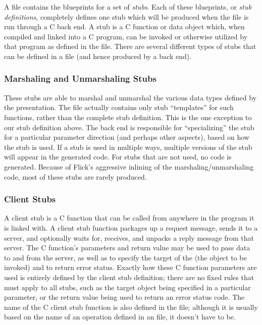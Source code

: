 A \PRESC{} file contains the blueprints for a set of \emph{stubs}.  Each of
these blueprints, or \emph{stub definitions}, completely defines one stub which
will be produced when the \PRESC{} file is run through a C back end.  A stub
is a C function or data object which, when compiled and linked into a C
program, can be invoked or otherwise utilized by that program as defined in the
\PRESC{} file.  There are several different types of stubs that can be defined
in a \PRESC{} file (and hence produced by a back end).



\subsubsection{Marshaling and Unmarshaling Stubs}

These stubs are able to marshal and unmarshal the various data types defined by
the presentation.  The \PRESC{} file actually contains only stub ``templates''
for such functions, rather than the complete stub definition.  This is the one
exception to our stub definition above.  The back end is responsible for
``specializing'' the stub for a particular parameter direction (and perhaps
other aspects), based on how the stub is used.  If a stub is used in multiple
ways, multiple versions of the stub will appear in the generated code.  For
stubs that are not used, no code is generated.  Because of Flick's aggressive
inlining of the marshaling/unmarshaling code, most of these stubs are rarely
produced.



\subsubsection{Client Stubs}

A client stub is a C function that can be called from anywhere in the program
it is linked with.  A client stub function packages up a request message, sends
it to a server, and optionally waits for, receives, and unpacks a reply message
from that server.  The C function's parameters and return value may be used to
pass data to and from the server, as well as to specify the target of the
\RPC{} (the object to be invoked) and to return error status.  Exactly how
these C function parameters are used is entirely defined by the client stub
definition; there are no fixed rules that must apply to all stubs, such as the
target object being specified in a particular parameter, or the return value
being used to return an error status code.  The name of the C client stub
function is also defined in the \PRESC{} file; although it is usually based on
the name of an \RPC{} operation defined in an \IDL{} file, it doesn't have to
be.

